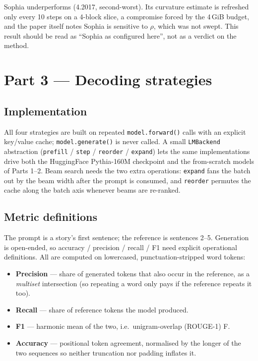 \documentclass[11pt]{article}
\begin{document}
Sophia underperforms (4.2017, second-worst). Its curvature estimate is refreshed
only every 10 steps on a 4-block slice, a compromise forced by the 4\,GiB budget,
and the paper itself notes Sophia is sensitive to $\rho$, which was not swept.
This result should be read as ``Sophia as configured here'', not as a verdict on
the method.

\section{Part 3 --- Decoding strategies}

\subsection{Implementation}

All four strategies are built on repeated \texttt{model.forward()} calls with an
explicit key/value cache; \texttt{model.generate()} is never called. A small
\texttt{LMBackend} abstraction (\texttt{prefill} / \texttt{step} /
\texttt{reorder} / \texttt{expand}) lets the same implementations drive both the
HuggingFace Pythia-160M checkpoint and the from-scratch models of Parts 1--2.
Beam search needs the two extra operations: \texttt{expand} fans the batch out by
the beam width after the prompt is consumed, and \texttt{reorder} permutes the
cache along the batch axis whenever beams are re-ranked.

\subsection{Metric definitions}

The prompt is a story's first sentence; the reference is sentences 2--5.
Generation is open-ended, so accuracy / precision / recall / F1 need explicit
operational definitions. All are computed on lowercased, punctuation-stripped
word tokens:

\begin{itemize}
  \item \textbf{Precision} --- share of generated tokens that also occur in the
        reference, as a \emph{multiset} intersection (so repeating a word only
        pays if the reference repeats it too).
  \item \textbf{Recall} --- share of reference tokens the model produced.
  \item \textbf{F1} --- harmonic mean of the two, i.e.\ unigram-overlap
        (ROUGE-1) F.
  \item \textbf{Accuracy} --- positional token agreement, normalised by the
        longer of the two sequences so neither truncation nor padding inflates it.
\end{itemize}
\end{document}
